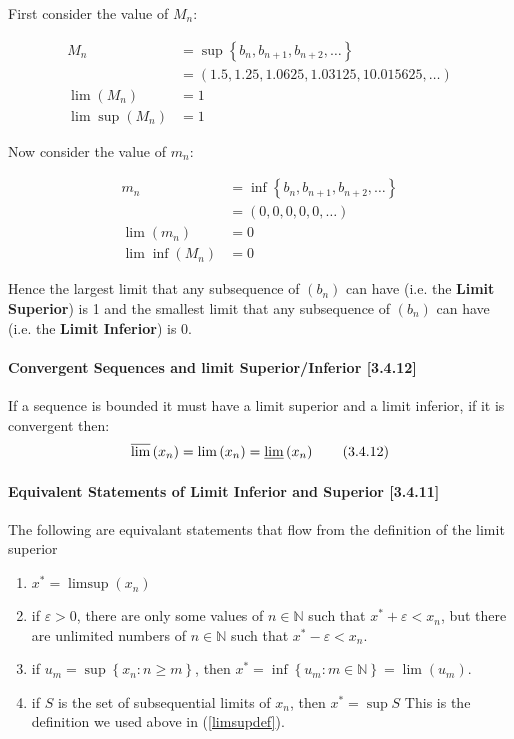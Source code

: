 \documentclass[class=article, crop=false]{standalone}
\begin{document}
First consider the value of $M_n$:

\begin{align}
  M_n & = \sup \left\{ b_n, b_{n+1}, b_{n+2}, \dots \right\} \label{Mnvalinsupeg}\\
  &= \left( 1.5, 1.25, 1.0625, 1.03125, 10.015625, \dots \right) \label{supsasdec} \\
  \lim(M_n) &= 1 \label{Mnis1supeg} \\
  \lim \sup (M_n) &= 1 \label{equivtolimsup}
\end{align}


Now consider the value of $m_n$:

\begin{align}
  m_n & = \inf\left\{ b_n, b_{n+1}, b_{n+2}, \dots \right\} \label{mnvalininfeg}\\
  &= \left( 0, 0, 0, 0, 0, \dots \right) \label{infvals} \\
  \lim(m_n) &= 0 \label{mnis1infeg} \\
  \lim \inf (M_n) &= 0 \label{equivtoliminf}
\end{align}

Hence the largest limit that any subsequence of $\left( b_n \right)$ can have (i.e. the \textbf{Limit Superior}) is 1 and
the smallest limit that any subsequence of $\left( b_n \right)$ can have (i.e. the \textbf{Limit Inferior}) is 0.

\paragraph{Convergent Sequences and limit Superior/Inferior [3.4.12]}
 If a sequence is bounded it must have a limit superior and a limit inferior, if it is convergent then:
 \begin{align}
   \varlimsup \left( x_n \right) = \lim \left( x_n \right) = \varliminf \left( x_n \right) \tag{3.4.12}
   \label{3412}
 \end{align}

\paragraph{Equivalent Statements of Limit Inferior and Superior [3.4.11]}
The following are equivalant statements that flow from the definition of the limit superior

\begin{enumerate}
  \item $x^* = \limsup \left( x_n \right)$\\
  \item if $\varepsilon > 0$, there are only some values of $n \in \mathbb{N}$ such that $x^* + \varepsilon < x_n$, but there are unlimited numbers of $n \in \mathbb{N}$ such that $x^* - \varepsilon < x_n$. \\
  \item if $u_m = \sup \left\{ x_n : n \geq m \right\}$, then $x^* = \inf \left\{ u_m: m \in \mathbb{N} \right\} = \lim \left( u_m \right)$. \\
  \item if $S$ is the set of subsequential limits of $x_n$, then $x^* = \sup S$
    \subitem This is the definition we used above in (\ref{limsupdef}).
\end{enumerate}
\end{document}
